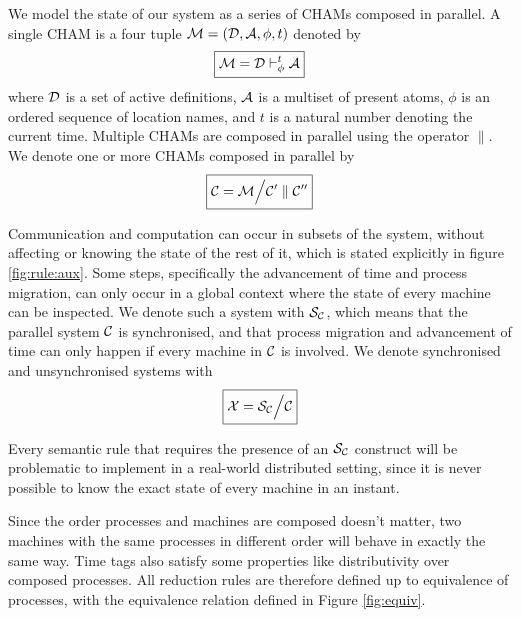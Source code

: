 We model the state of our system as a series of CHAMs composed in parallel. A
single CHAM is a four tuple $\mathcal{M} = (\mathcal{D}, \mathcal{A}, \phi, t)$ denoted by
\begin{equation*}
 \boxed{\mathcal{M} = \mathcal{D} \vdash^{t}_{\phi} \mathcal{A}}
\end{equation*}
where $\mathcal{D}$ is a set of active definitions, $\mathcal{A}$ is a multiset
of present atoms, $\phi$ is an ordered sequence of location names, and $t$ is
a natural number denoting the current time. Multiple CHAMs are composed in
parallel using the operator $\parallel$. We denote one or more CHAMs composed
in parallel by
\begin{equation*}
 \boxed{\mathcal{C} = \mathcal{M} \Big\slash \mathcal{C}'\parallel\mathcal{C}''}
\end{equation*}

Communication and computation can occur in subsets of the system, without
affecting or knowing the state of the rest of it, which is stated explicitly in
figure \ref{fig:rule:aux}. Some steps, specifically the advancement of time and
process migration, can only occur in a global context where the state of every
machine can be inspected. We denote such a system with $\mathcal{S}_{\mathcal{C}}$, which means
that the parallel system $\mathcal{C}$ is synchronised, and that process migration and
advancement of time can only happen if every machine in $\mathcal{C}$ is involved. We
denote synchronised and unsynchronised systems with
\begin{equation*}
 \boxed{\mathcal{X} = \mathcal{S}_{\mathcal{C}} \Big\slash \mathcal{C}}
\end{equation*}

Every semantic rule that requires the presence of an $\mathcal{S}_{\mathcal{C}}$ construct will be
problematic to implement in a real-world distributed setting, since it is never
possible to know the exact state of every machine in an instant.

Since the order processes and machines are composed doesn't matter, two
machines with the same processes in different order will behave in exactly the
same way. Time tags also satisfy some properties like distributivity over
composed processes. All reduction rules are therefore defined up to equivalence
of processes, with the equivalence relation defined in Figure \ref{fig:equiv}.

